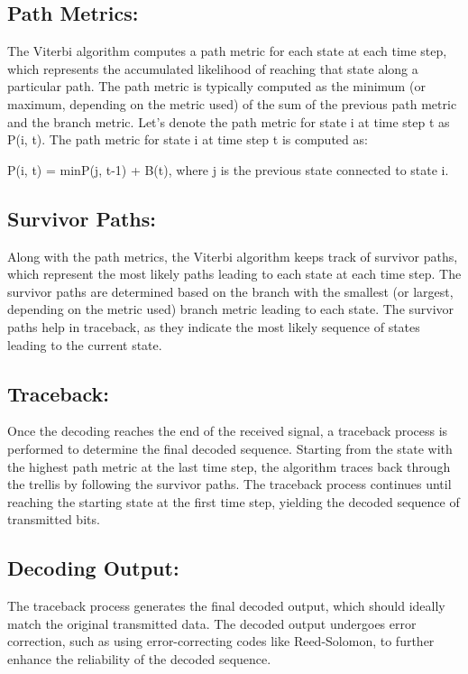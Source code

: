 \documentclass[10pt, onecolumn]{article}
\begin{document}
\subsection{Path Metrics:}
The Viterbi algorithm computes a path metric for each state at each time step, which represents the accumulated likelihood of reaching that state along a particular path.
The path metric is typically computed as the minimum (or maximum, depending on the metric used) of the sum of the previous path metric and the branch metric.
Let's denote the path metric for state i at time step t as P(i, t). The path metric for state i at time step t is computed as:
\begin{center}
P(i, t) = min{P(j, t-1) + B(t)}, where j is the previous state connected to state i.
\end{center}

\subsection{Survivor Paths:}
Along with the path metrics, the Viterbi algorithm keeps track of survivor paths, which represent the most likely paths leading to each state at each time step.
The survivor paths are determined based on the branch with the smallest (or largest, depending on the metric used) branch metric leading to each state.
The survivor paths help in traceback, as they indicate the most likely sequence of states leading to the current state.

\subsection{Traceback:}
Once the decoding reaches the end of the received signal, a traceback process is performed to determine the final decoded sequence.
Starting from the state with the highest path metric at the last time step, the algorithm traces back through the trellis by following the survivor paths.
The traceback process continues until reaching the starting state at the first time step, yielding the decoded sequence of transmitted bits.

\subsection{Decoding Output:}
The traceback process generates the final decoded output, which should ideally match the original transmitted data.
The decoded output undergoes error correction, such as using error-correcting codes like Reed-Solomon, to further enhance the reliability of the decoded sequence.
\end{document}
